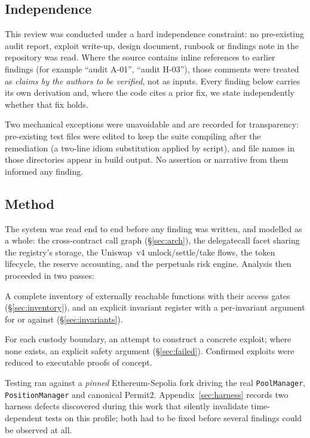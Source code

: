 \documentclass[10pt,a4paper]{article}
\newcommand{\code}[1]{\texttt{\small #1}}
\begin{document}
\subsection{Independence}
This review was conducted under a hard independence constraint: no pre-existing audit
report, exploit write-up, design document, runbook or findings note in the repository was
read. Where the source contains inline references to earlier findings (for example
``audit A-01'', ``audit H-03''), those comments were treated as \emph{claims by the
authors to be verified}, not as inputs. Every finding below carries its own derivation
and, where the code cites a prior fix, we state independently whether that fix holds.

Two mechanical exceptions were unavoidable and are recorded for transparency: pre-existing
test files were edited to keep the suite compiling after the remediation (a two-line
idiom substitution applied by script), and file names in those directories appear in
build output. No assertion or narrative from them informed any finding.

\subsection{Method}
The system was read end to end before any finding was written, and modelled as a whole:
the cross-contract call graph (\S\ref{sec:arch}), the delegatecall facet sharing the
registry's storage, the Uniswap~v4 unlock/settle/take flows, the token lifecycle, the
reserve accounting, and the perpetuals risk engine. Analysis then proceeded in two
passes:

\begin{description}[leftmargin=1.4em,style=nextline]
\item[Pass A --- coverage] A complete inventory of externally reachable functions with
their access gates (\S\ref{sec:inventory}), and an explicit invariant register with a
per-invariant argument for or against (\S\ref{sec:invariants}).
\item[Pass B --- adversarial] For each custody boundary, an attempt to construct a
concrete exploit; where none exists, an explicit safety argument
(\S\ref{sec:failed}). Confirmed exploits were reduced to executable proofs of concept.
\end{description}

Testing ran against a \emph{pinned} Ethereum-Sepolia fork driving the real
\code{PoolManager}, \code{PositionManager} and canonical Permit2. Appendix~\ref{sec:harness}
records two harness defects discovered during this work that silently invalidate
time-dependent tests on this profile; both had to be fixed before several findings could
be observed at all.
\end{document}
